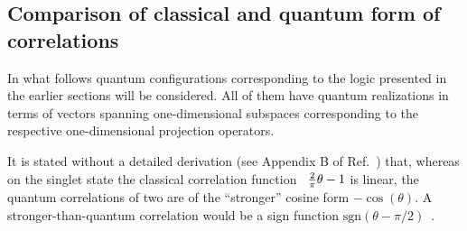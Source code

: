\subsection{Comparison of classical and quantum form of correlations}

In what follows quantum configurations corresponding to the logic presented in the earlier sections will be considered.
All of them have quantum realizations in terms of vectors spanning one-dimensional subspaces
corresponding to the respective one-dimensional projection operators.

It is stated without a detailed derivation (see Appendix B of Ref.~\cite{svozil-pac}) that,
whereas on the singlet state the classical correlation function~\cite{peres222}
$
 {2 \over \pi}\theta - 1
$
is linear,
the quantum correlations of two   are of the ``stronger'' cosine form
$
 -\cos (\theta )
$.
A stronger-than-quantum correlation would be a sign function
$
 \text{sgn} (\theta-\pi /2 )
$~\cite{svozil-krenn}.


